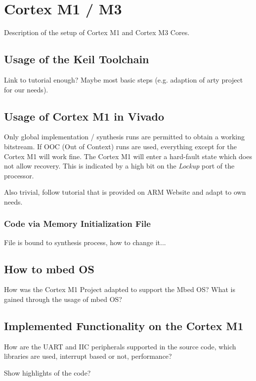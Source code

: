 \section{Cortex M1 / M3}

Description of the setup of Cortex M1 and Cortex M3 Cores. \cite{arm_arm_2018} \cite{arm_cortex-m1_nodate}

\subsection{Usage of the Keil Toolchain}

Link to tutorial enough? Maybe most basic steps (e.g. adaption of arty project for our needs). \cite{noauthor_getting_nodate}

\subsection{Usage of Cortex M1 in Vivado}

Only global implementation / synthesis runs are permitted to obtain a working bitstream.
If OOC (Out of Context) runs are used, everything except for the Cortex M1 will work fine. 
The Cortex M1 will enter a hard-fault state which does not allow recovery. 
This is indicated by a high bit on the \textit{Lockup} port of the processor.

Also trivial, follow tutorial that is provided on ARM Website and adapt to own needs.

\subsubsection{Code via Memory Initialization File}

File is bound to synthesis process, how to change it...

\subsection{How to mbed OS}

How was the Cortex M1 Project adapted to support the Mbed OS?
What is gained through the usage of mbed OS?

\subsection{Implemented Functionality on the Cortex M1}

How are the UART and IIC peripherals supported in the source code, which libraries are used, interrupt based or not, performance?

Show highlights of the code?
